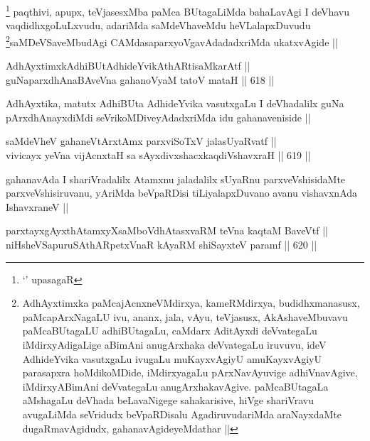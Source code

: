 \begin{artha}
\footnote{`\stext' upasagaR} paqthivi, apupx, teVjasesxMba paMca BUtagaLiMda bahaLavAgi
I deVhavu vaqdidhxgoLuLxvudu, adariMda saMdeVhaveMdu
heVLalapxDuvudu \footnote{AdhAyxtimxka paMcajAcnxneVMdirxya,
  kameRMdirxya, budidhxmanasusx, paMcapArxNagaLU ivu, ananx, jala,
  vAyu, teVjasusx, AkAshaveMbuvavu paMcaBUtagaLU adhiBUtagaLu, caMdarx
  AditAyxdi deVvategaLu iMdirxyAdigaLige aBimAni anugArxhaka
  deVvategaLu iruvuvu, ideV AdhideYvika vasutxgaLu ivugaLu
  muKayxvAgiyU amuKayxvAgiyU parasapxra hoMdikoMDide, iMdirxyagaLu
  pArxNavAyuvige adhiVnavAgive, iMdirxyABimAni deVvategaLu
  anugArxhakavAgive. paMcaBUtagaLa aMshagaLu deVhada beLavaNigege
  sahakarisive, hiVge shariVravu avugaLiMda seVridudx beVpaRDisalu
  AgadiruvudariMda araNayxdaMte dugaRmavAgidudx, gahanavAgideyeMdathar ||}saMDeVSaveMbudAgi
CAMdasaparxyoVgavAdadadxriMda ukatxvAgide ||
\end{artha}


\begin{shl}
AdhAyxtimxkAdhiBUtAdhideYvikAthARtisaMkarAtf || \\
guNaparxdhAnaBAveVna gahanoV\s yaM tatoV mataH ||  618 ||  
\end{shl}

\begin{artha}
AdhAyxtika, matutx AdhiBUta AdhideYvika vasutxgaLu I deVhadalilx guNa
pArxdhAnayxdiMdi seVrikoMDiveyAdadxriMda idu gahanaveniside ||
\end{artha}


\begin{shl}
saMdeVheV gahaneV\s tArx\s \s tAmx parxviSoTxV jalasUyaRvatf || \\
vivicayx yeVna vijAcnxtaH sa sAyxdivxshacxkaqdiVshavxraH ||  619 ||  
\end{shl}

\begin{artha}
gahanavAda I shariVradalilx Atamxnu jaladalilx sUyaRnu
parxveVshisidaMte parxveVshisiruvanu, yAriMda beVpaRDisi
tiLiyalapxDuvano avanu vishavxnAda IshavxraneV ||
\end{artha}


\begin{shl}
parxtayxgAyxthAtamxyXsaMboVdhAtasxvaRM teVna kaqtaM BaveVtf || \\
niHsheVSapuruSAthARpetxVnaR kAyaRM shiSayxteV paramf ||  620 ||  
\end{shl}

